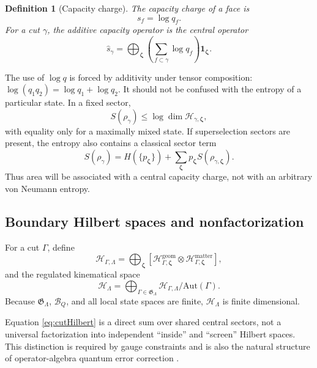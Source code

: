 \documentclass[11pt]{article}
\newtheorem{definition}{Definition}[section]
\theoremstyle{remark}
\newcommand{\cH}{\mathcal H}
\newcommand{\id}{\mathbf 1}
\begin{document}
\begin{definition}[Capacity charge]
The capacity charge of a face is
\begin{equation}
  s_f=\log q_f.
\end{equation}
For a cut \(\gamma\), the additive capacity operator is the central
operator
\begin{equation}
  \widehat s_\gamma
  =\bigoplus_{\bm\zeta}
   \left(\sum_{f\subset\gamma}\log q_f\right)
   \id_{\bm\zeta}.
  \label{eq:capacity}
\end{equation}
\end{definition}

The use of \(\log q\) is forced by additivity under tensor composition:
\(\log(q_1q_2)=\log q_1+\log q_2\).  It should not be confused with the
entropy of a particular state.  In a fixed sector,
\begin{equation}
  S(\rho_\gamma)\le \log\dim\cH_{\gamma,\bm\zeta},
\end{equation}
with equality only for a maximally mixed state.  If superselection sectors
are present, the entropy also contains a classical sector term
\begin{equation}
  S(\rho_\gamma)
  =H(\{p_{\bm\zeta}\})
   +\sum_{\bm\zeta}p_{\bm\zeta}S(\rho_{\gamma,\bm\zeta}).
\end{equation}
Thus area will be associated with a central capacity charge, not with an
arbitrary von Neumann entropy.

\subsection{Boundary Hilbert spaces and nonfactorization}

For a cut \(\Gamma\), define
\begin{equation}
  \cH_{\Gamma,\Lambda}
  =
  \bigoplus_{\bm\zeta}
  \left[
    \cH^{\mathrm{geom}}_{\Gamma,\bm\zeta}
    \otimes
    \cH^{\mathrm{matter}}_{\Gamma,\bm\zeta}
  \right],
  \label{eq:cutHilbert}
\end{equation}
and the regulated kinematical space
\begin{equation}
  \cH_\Lambda
  =
  \bigoplus_{\Gamma\in\mathfrak G_\Lambda}
  \cH_{\Gamma,\Lambda}\big/\mathrm{Aut}(\Gamma).
  \label{eq:totalHilbert}
\end{equation}
Because \(\mathfrak G_\Lambda\), \(\mathcal B_Q\), and all local state
spaces are finite, \(\cH_\Lambda\) is finite dimensional.

Equation \eqref{eq:cutHilbert} is a direct sum over shared central sectors,
not a universal factorization into independent ``inside'' and ``screen''
Hilbert spaces.  This distinction is required by gauge constraints and is
also the natural structure of operator-algebra quantum error correction
\cite{ADH2015,JLMS2016}.
\end{document}
